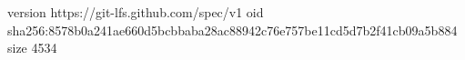 version https://git-lfs.github.com/spec/v1
oid sha256:8578b0a241ae660d5bcbbaba28ac88942c76e757be11cd5d7b2f41cb09a5b884
size 4534
